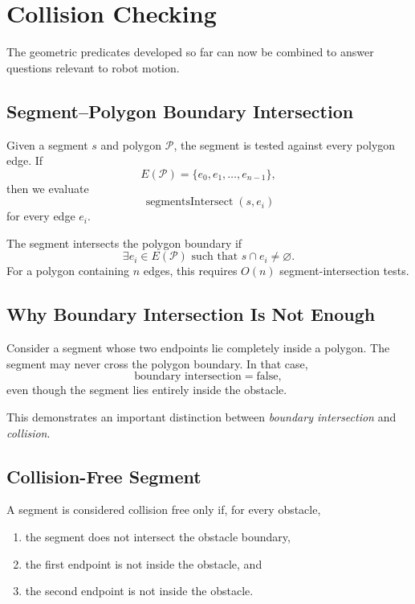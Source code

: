\section{Collision Checking}

The geometric predicates developed so far can now be combined to answer
questions relevant to robot motion.

\subsection{Segment--Polygon Boundary Intersection}

Given a segment $s$ and polygon $\mathcal{P}$, the segment is tested against
every polygon edge. If
\[
E(\mathcal{P})=\{e_0,e_1,\ldots,e_{n-1}\},
\]
then we evaluate
\[
\operatorname{segmentsIntersect}(s,e_i)
\]
for every edge $e_i$.

The segment intersects the polygon boundary if
\[
\exists e_i\in E(\mathcal{P}) \text{ such that } s\cap e_i\neq\varnothing.
\]
For a polygon containing $n$ edges, this requires $O(n)$ segment-intersection
tests.

\subsection{Why Boundary Intersection Is Not Enough}

Consider a segment whose two endpoints lie completely inside a polygon. The
segment may never cross the polygon boundary. In that case,
\[
\text{boundary intersection}=\text{false},
\]
even though the segment lies entirely inside the obstacle.

This demonstrates an important distinction between \emph{boundary
intersection} and \emph{collision}.

\subsection{Collision-Free Segment}

A segment is considered collision free only if, for every obstacle,
\begin{enumerate}
    \item the segment does not intersect the obstacle boundary,
    \item the first endpoint is not inside the obstacle, and
    \item the second endpoint is not inside the obstacle.
\end{enumerate}

